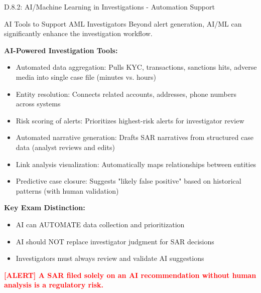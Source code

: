 \documentclass[11pt,a4paper]{beamer}
\newcommand{\redflag}[1]{\textcolor{red}{\textbf{[ALERT] #1}}}
\begin{document}
\begin{frame}{D.8.2: AI/Machine Learning in Investigations - Automation Support}
	\begin{block}{AI Tools to Support AML Investigators}
		Beyond alert generation, AI/ML can significantly enhance the investigation workflow.
	\end{block}
	\textbf{AI-Powered Investigation Tools:}
	\begin{itemize}
		\item Automated data aggregation: Pulls KYC, transactions, sanctions hits, adverse media into single case file (minutes vs. hours)
		\item Entity resolution: Connects related accounts, addresses, phone numbers across systems
		\item Risk scoring of alerts: Prioritizes highest-risk alerts for investigator review
		\item Automated narrative generation: Drafts SAR narratives from structured case data (analyst reviews and edits)
		\item Link analysis visualization: Automatically maps relationships between entities
		\item Predictive case closure: Suggests "likely false positive" based on historical patterns (with human validation)
	\end{itemize}
	\textbf{Key Exam Distinction:}
	\begin{itemize}
		\item AI can AUTOMATE data collection and prioritization
		\item AI should NOT replace investigator judgment for SAR decisions
		\item Investigators must always review and validate AI suggestions
	\end{itemize}
	\redflag{A SAR filed solely on an AI recommendation without human analysis is a regulatory risk.}
\end{frame}
\end{document}
